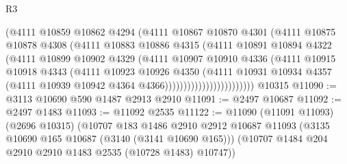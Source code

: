 \begin{lexlean}{R3}
\begin{coremodule}
                              (@4111
                                @10859
                                @10862
                                @4294
                                (@4111
                                  @10867
                                  @10870
                                  @4301
                                  (@4111
                                    @10875
                                    @10878
                                    @4308
                                    (@4111
                                      @10883
                                      @10886
                                      @4315
                                      (@4111
                                        @10891
                                        @10894
                                        @4322
                                        (@4111
                                          @10899
                                          @10902
                                          @4329
                                          (@4111
                                            @10907
                                            @10910
                                            @4336
                                            (@4111
                                              @10915
                                              @10918
                                              @4343
                                              (@4111
                                                @10923
                                                @10926
                                                @4350
                                                (@4111
                                                  @10931
                                                  @10934
                                                  @4357
                                                  (@4111
                                                    @10939
                                                    @10942
                                                    @4364
                                                    @4366))))))))))))))))))))))))
    @10315
@11090 := @3113 @10690 @590 @1487 @2913 @2910
@11091 := @2497 @10687
@11092 := @2497 @1483
@11093 := @11092 @2535
@11122 := @11090
    (@11091 @11093)
    (@2696 @10315)
    (@10707
      @183
      @1486
      @2910
      @2912
      @10687
      @11093
      (@3135 @10690 @165 @10687 (@3140 (@3141 @10690 @165)))
      (@10707 @1484 @204 @2910 @2910 @1483 @2535 (@10728 @1483) @10747))

\end{coremodule}
\end{lexlean}
